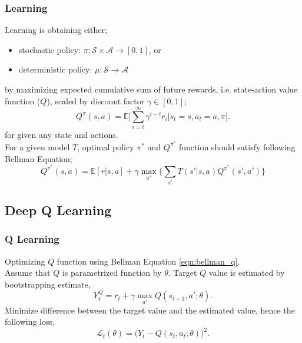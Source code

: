 \documentclass{beamer}
\begin{document}
\begin{frame}
\frametitle{Learning}
Learning is obtaining either;
\begin{itemize}
	\item stochastic policy: $\pi: \mathcal{S}\times\mathcal{A} \rightarrow [0,1]$, or
	\item deterministic policy: $\mu: \mathcal{S}\rightarrow\mathcal{A}$
\end{itemize}
by maximizing expected cumulative sum of future rewards, i.e. state-action value function ($Q$), scaled by discount factor $\gamma \in [0,1]$;
\begin{equation}
Q^{\pi}(s,a) = \mathbb{E}\bigg[\sum_{i=t}^{\infty} \gamma^{i-t} r_i|s_t=s, a_t=a, \pi\bigg]. %
\end{equation}
for given any state and actions. \\
For a given model $T$, optimal policy $\pi^*$ and $Q^{\pi^*}$ function should satisfy following Bellman Equation;
\begin{equation}
\label{eqn:bellman_q}
Q^{\pi^*}(s,a) = \mathbb{E}[r|s,a] + \gamma \max_{a'} \Big\{ \sum_{s'} T(s'|s,a) Q^{\pi^*}(s',a') \Big\}
\end{equation}
\end{frame}


\subsection{Deep Q Learning}

\begin{frame}
\frametitle{Q Learning}
Optimizing $Q$ function using Bellman Equation \ref{eqn:bellman_q}.\\
Assume that $Q$ is parametrized function by $\theta$.
Target $Q$ value is estimated by bootstrapping estimate, 
\begin{equation}
\label{eqn:q_target}
Y_t^Q = r_t + \gamma \max_{a'} Q(s_{t+1},a';\theta).
\end{equation}
Minimize difference between the target value and the estimated value, hence the following loss,
\begin{equation}
\label{eqn:q_loss}
\mathcal{L}_t(\theta) = \big( Y_t - Q(s_t,a_t;\theta) \big) ^ 2.
\end{equation}
\end{frame}
\end{document}
